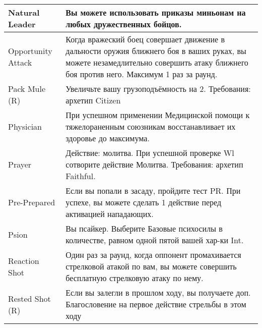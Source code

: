 \begin{table}[h]
\begin{tabularx}{\textwidth}{|l|X|}
        Natural Leader     & Вы можете использовать приказы миньонам на любых дружественных бойцов.                                                                                                                                                             \\ \hline
        Opportunity Attack & Когда вражеский боец совершает движение в дальности оружия ближнего боя в ваших руках, вы можете незамедлительно совершить атаку ближнего боя против него. Максимум 1 раз за раунд.                                                                   \\ \hline
        Pack Mule (R)      & Увеличьте вашу грузоподъёмность на 2. Требования: архетип Citizen                                                                                                                                                                  \\ \hline
        Physician          & При успешном применении Медицинской помощи к тяжелораненным союзникам восстанавливает их здоровье до максимума.                                                                                                                    \\ \hline
        Prayer             & Действие: молитва. При успешной проверке Wl сотворите действие Молитва. Требования: архетип Faithful.                                                                                                                              \\ \hline
        Pre-Prepared       & Если вы попали в засаду, пройдите тест PR. При успехе, вы можете сделать 1 действие перед активацией нападающих.                                                                                                                   \\ \hline
        Psion              & Вы псайкер. Выберите Базовые психосилы в количестве, равном одной пятой вашей хар-ки Int.                                                                                                                                          \\ \hline
        Reaction Shot      & Один раз за раунд, когда оппонент промахивается стрелковой атакой по вам, вы можете совершить бесплатную стрелковую атаку по нему.                                                                                                 \\ \hline
        Rested Shot (R)    & Если вы залегли в прошлом ходу, вы получаете доп. Благословение на первое действие стрельбы в этом ходу                                                                                                                            \\ \hline

\end{tabularx}
\end{table}
